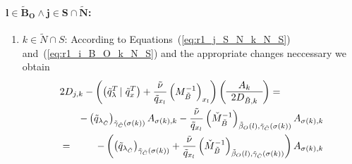 \documentclass[a4paper]{article}
\begin{document}
\paragraph{$\mathbf{l \in \tilde{B}_{O} \wedge j \in S \cap \tilde{N}}$:}
\begin{enumerate}
\item $k \in \tilde{N} \cap S$:
According to Equations~(\ref{eq:r1_j_S_N_k_N_S})
and~(\ref{eq:r1_i_B_O_k_N_S}) and the appropriate changes neccessary we obtain
\begin{eqnarray}
\lefteqn{
2D_{j,k}-\left(
          \left(\tilde{q}_{\lambda}^{T}\left|\right. \tilde{q}_{x}^{T}\right)
	  +\frac{\tilde{\nu}}{\tilde{q}_{x_{l}}}
	  \left(M_{\tilde{B}}^{-1}\right)_{x_{l}}
	\right)
\left(\begin{array}{c}
        A_{k} \\
	\hline
	2D_{\tilde{B},k}
      \end{array}
\right)
=}
\nonumber \\
&&
-\left(\tilde{q}_{\lambda_{\tilde{C}}}\right)_{\tilde{\gamma}_{\tilde{C}}
  (\sigma(k))}A_{\sigma(k),k}
-\frac{\tilde{\nu}}{\tilde{q}_{x_{l}}}
 \left(\check{M}_{\tilde{B}}^{-1}\right)_{\tilde{\beta}_{O}(l),
 \tilde{\gamma}_{\tilde{C}}(\sigma(k))}
  A_{\sigma(k), k}
\nonumber \\
&=&
-\left(
 \left(\tilde{q}_{\lambda_{\tilde{C}}}\right)_{\tilde{\gamma}_{\tilde{C}}
 (\sigma(k))}
+\frac{\tilde{\nu}}{\tilde{q}_{x_{l}}}
 \left(\check{M}_{\tilde{B}}^{-1}\right)_{\tilde{\beta}_{O}(l),
 \tilde{\gamma}_{\tilde{C}}(\sigma(k))}
\right)
A_{\sigma(k), k}
\end{eqnarray}


\end{enumerate}
\end{document}
